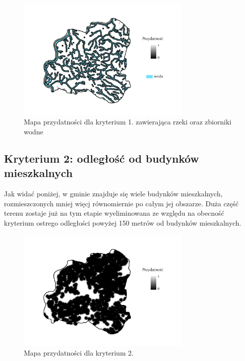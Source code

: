 \documentclass{article}
\begin{document}
\begin{figure}[H]
    \centering
    \includegraphics[width=0.75\textwidth]{img/plesna-kryterium1-woda.jpg}
    \caption{Mapa przydatności dla kryterium 1. zawierająca rzeki oraz zbiorniki wodne}
\end{figure}

\subsection{Kryterium 2: odległość od budynków mieszkalnych}
Jak widać poniżej, w gminie znajduje się wiele budynków mieszkalnych, rozmieszczonych mniej więcj równomiernie po całym jej obszarze. Duża część terenu zostaje już na tym etapie wyeliminowana ze względu na obecność kryterium ostrego odległości powyżej 150 metrów od budynków mieszkalnych.

\begin{figure}[H]
    \centering
    \includegraphics[width=0.75\textwidth]{img/plesna-kryterium2-layout.jpg}
    \caption{Mapa przydatności dla kryterium 2.}
\end{figure}
\end{document}
